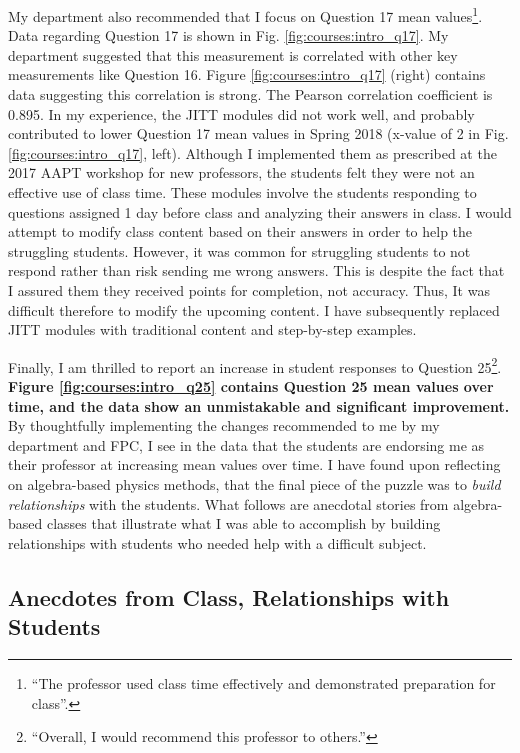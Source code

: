 \documentclass[../../main.tex]{subfiles}
\begin{document}
My department also recommended that I focus on Question 17 mean values\footnote{``The professor used class time effectively and demonstrated preparation for class''.}.  Data regarding Question 17 is shown in Fig. \ref{fig:courses:intro_q17}.  My department suggested that this measurement is correlated with other key measurements like Question 16.  Figure \ref{fig:courses:intro_q17} (right) contains data suggesting this correlation is strong.  The Pearson correlation coefficient is 0.895.  In my experience, the JITT modules did not work well, and probably contributed to lower Question 17 mean values in Spring 2018 (x-value of 2 in Fig. \ref{fig:courses:intro_q17}, left).  Although I implemented them as prescribed at the 2017 AAPT workshop for new professors, the students felt they were not an effective use of class time.  These modules involve the students responding to questions assigned 1 day before class and analyzing their answers in class.  I would attempt to modify class content based on their answers in order to help the struggling students.  However, it was common for struggling students to not respond rather than risk sending me wrong answers.  This is despite the fact that I assured them they received points for completion, not accuracy.  Thus, It was difficult therefore to modify the upcoming content.  I have subsequently replaced JITT modules with traditional content and step-by-step examples.  \\ \hspace{0.1cm}

Finally, I am thrilled to report an increase in student responses to Question 25\footnote{``Overall, I would recommend this professor to others.''}. \textbf{Figure \ref{fig:courses:intro_q25} contains Question 25 mean values over time, and the data show an unmistakable and significant improvement.}  By thoughtfully implementing the changes recommended to me by my department and FPC, I see in the data that the students are endorsing me as their professor at increasing mean values over time.  I have found upon reflecting on algebra-based physics methods, that the final piece of the puzzle was to \textit{build relationships} with the students.  What follows are anecdotal stories from algebra-based classes that illustrate what I was able to accomplish by building relationships with students who needed help with a difficult subject.  \\ \hspace{0.1cm}

\subsection{Anecdotes from Class, Relationships with Students}
\end{document}
